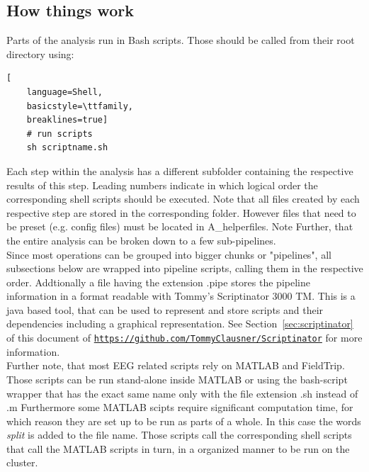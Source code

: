 \documentclass[12pt,a4paper]{scrartcl}
\begin{document}
\subsection{How things work}
Parts of the analysis run in Bash scripts. Those should be called from their root directory using:
\begin{lstlisting}[
    language=Shell,
    basicstyle=\ttfamily,
    breaklines=true]
    # run scripts
    sh scriptname.sh
\end{lstlisting}
Each step within the analysis has a different subfolder containing the respective results of this step. Leading numbers indicate in which logical order the corresponding shell scripts should be executed. Note that all files created by each respective step are stored in the corresponding folder. However files that need to be preset (e.g. config files) must be located in A\_helperfiles. Note Further, that the entire analysis can be broken down to a few sub-pipelines.\\

\noindent Since most operations can be grouped into bigger chunks or "pipelines", all subsections below are wrapped into pipeline scripts, calling them in the respective order. Addtionally a file having the extension .pipe stores the pipeline information in a format readable with Tommy's Scriptinator 3000 TM. This is a java based tool, that can be used to represent and store scripts and their dependencies including a graphical representation. See Section~\ref{sec:scriptinator} of this document of \href{https://github.com/TommyClausner/Scriptinator}{\nolinkurl{https://github.com/TommyClausner/Scriptinator}} for more information.\\

\noindent Further note, that most EEG related scripts rely on MATLAB and FieldTrip. Those scripts can be run stand-alone inside MATLAB or using the bash-script wrapper that has the exact same name only with the file extension .sh instead of .m Furthermore some MATLAB scipts require significant computation time, for which reason they are set up to be run as parts of a whole. In this case the words \textit{split} is added to the file name. Those scripts call the corresponding shell scripts that call the MATLAB scripts in turn, in a organized manner to be run on the cluster.\\
\end{document}
